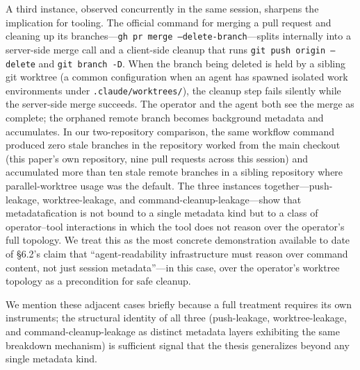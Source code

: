 \documentclass[sigconf, nonacm, anonymous=false]{acmart}
\begin{document}
A third instance, observed concurrently in the same session, sharpens the implication for tooling. The official command for merging a pull request and cleaning up its branches---\texttt{gh pr merge --delete-branch}---splits internally into a server-side merge call and a client-side cleanup that runs \texttt{git push origin --delete} and \texttt{git branch -D}. When the branch being deleted is held by a sibling git worktree (a common configuration when an agent has spawned isolated work environments under \texttt{.claude/worktrees/}), the cleanup step fails silently while the server-side merge succeeds. The operator and the agent both see the merge as complete; the orphaned remote branch becomes background metadata and accumulates. In our two-repository comparison, the same workflow command produced zero stale branches in the repository worked from the main checkout (this paper's own repository, nine pull requests across this session) and accumulated more than ten stale remote branches in a sibling repository where parallel-worktree usage was the default. The three instances together---push-leakage, worktree-leakage, and command-cleanup-leakage---show that metadatafication is not bound to a single metadata kind but to a class of operator--tool interactions in which the tool does not reason over the operator's full topology. We treat this as the most concrete demonstration available to date of \S6.2's claim that ``agent-readability infrastructure must reason over command content, not just session metadata''---in this case, over the operator's worktree topology as a precondition for safe cleanup.

We mention these adjacent cases briefly because a full treatment requires its own instruments; the structural identity of all three (push-leakage, worktree-leakage, and command-cleanup-leakage as distinct metadata layers exhibiting the same breakdown mechanism) is sufficient signal that the thesis generalizes beyond any single metadata kind.
\end{document}
